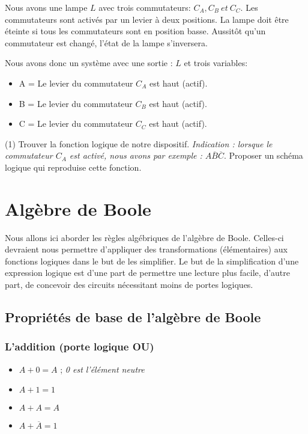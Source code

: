 \documentclass[a4paper,11pt]{book}
\theoremstyle{definition}
\theoremstyle{definition}
\begin{document}
\begin{exercise}
Nous avons une lampe $L$ avec trois commutateurs: $C_A, C_B\:et\: C_C$. Les commutateurs sont activés par un levier à deux positions. La lampe doit être éteinte si tous les commutateurs sont en position basse. Aussitôt qu'un commutateur est changé, l'état de la lampe s'inversera.

Nous avons donc un système avec une sortie : $L$ et trois variables:
\begin{itemize}
    \item A = Le levier du commutateur $C_A$ est haut (actif).
    \item B = Le levier du commutateur $C_B$ est haut (actif).
    \item C = Le levier du commutateur $C_C$ est haut (actif).
\end{itemize}
\begin{tasks}(1)
    \task Trouver la fonction logique de notre dispositif. \emph{Indication : lorsque le commutateur $C_A$ est activé, nous avons par exemple : $A\overline{B}\overline{C}$}.
    \task Proposer un schéma logique qui reproduise cette fonction.
\end{tasks}

\end{exercise}

\section{Algèbre de Boole}
Nous allons ici aborder les règles algébriques de l'algèbre de Boole. Celles-ci devraient nous permettre d'appliquer des transformations (élémentaires) aux fonctions logiques dans le but de les simplifier.
Le but de la simplification d'une expression logique est d'une part de permettre une lecture plus facile, d'autre part, de concevoir des circuits nécessitant moins de portes logiques.
\subsection{Propriétés de base de l'algèbre de Boole}
\subsubsection{L'addition (porte logique OU)}
\begin{itemize}
    \item $A + 0 = A$ ; \emph{0 est l'élément neutre}
    \item $A + 1 = 1$
    \item $A + A = A$
    \item $A + \overline{A} = 1$
\end{itemize}
\end{document}
